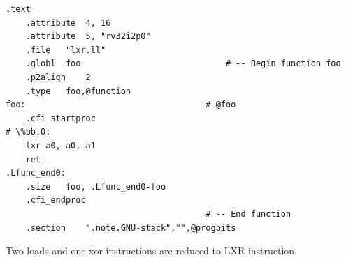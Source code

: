 

\begin{lstlisting}[caption= Assembly output with LXR instruction]
    .text
	.attribute	4, 16
	.attribute	5, "rv32i2p0"
	.file	"lxr.ll"
	.globl	foo                             # -- Begin function foo
	.p2align	2
	.type	foo,@function
foo:                                    # @foo
	.cfi_startproc
# \%bb.0:
	lxr	a0, a0, a1
	ret
.Lfunc_end0:
	.size	foo, .Lfunc_end0-foo
	.cfi_endproc
                                        # -- End function
	.section	".note.GNU-stack","",@progbits
\end{lstlisting}

Two loads and one xor instructions are reduced to LXR instruction.
\\\\
